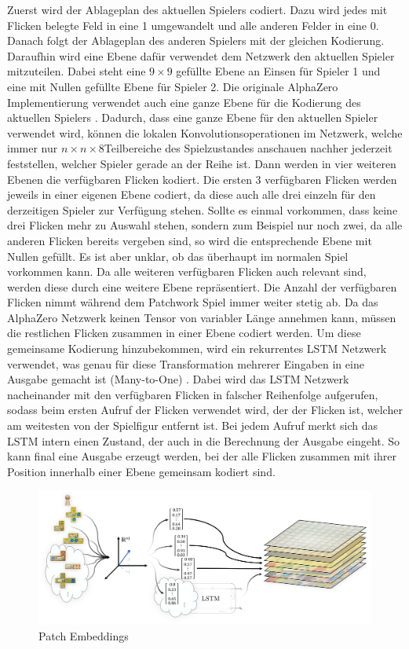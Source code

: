 Zuerst wird der Ablageplan des aktuellen Spielers codiert. Dazu wird jedes mit Flicken belegte Feld in eine 1 umgewandelt und alle anderen Felder in eine 0. Danach folgt der Ablageplan des anderen Spielers mit der gleichen Kodierung. Daraufhin wird eine Ebene dafür verwendet dem Netzwerk den aktuellen Spieler mitzuteilen. Dabei steht eine $9\times 9$ gefüllte Ebene an Einsen für Spieler 1 und eine mit Nullen gefüllte Ebene für Spieler 2. Die originale AlphaZero Implementierung verwendet auch eine ganze Ebene für die Kodierung des aktuellen Spielers \cite[Anhang]{2017.AlphaGoZeroPaper}. Dadurch, dass eine ganze Ebene für den aktuellen Spieler verwendet wird, können die lokalen Konvolutionsoperationen im Netzwerk, welche immer nur $n\times n\times 8$Teilbereiche des Spielzustandes anschauen nachher jederzeit feststellen, welcher Spieler gerade an der Reihe ist. Dann werden in vier weiteren Ebenen die verfügbaren Flicken kodiert. Die ersten 3 verfügbaren Flicken werden jeweils in einer eigenen Ebene codiert, da diese auch alle drei einzeln für den derzeitigen Spieler zur Verfügung stehen. Sollte es einmal vorkommen, dass keine drei Flicken mehr zu Auswahl stehen, sondern zum Beispiel nur noch zwei, da alle anderen Flicken bereits vergeben sind, so wird die entsprechende Ebene mit Nullen gefüllt. Es ist aber unklar, ob das überhaupt im normalen Spiel vorkommen kann. Da alle weiteren verfügbaren Flicken auch relevant sind, werden diese durch eine weitere Ebene repräsentiert. Die Anzahl der verfügbaren Flicken nimmt während dem Patchwork Spiel immer weiter stetig ab. Da das AlphaZero Netzwerk keinen Tensor von variabler Länge annehmen kann, müssen die restlichen Flicken zusammen in einer Ebene codiert werden. Um diese gemeinsame Kodierung hinzubekommen, wird ein rekurrentes \ac{LSTM} Netzwerk verwendet, was genau für diese Transformation mehrerer Eingaben in eine Ausgabe gemacht ist (Many-to-One) \cite{2015.RNN}. Dabei wird das \ac{LSTM} Netzwerk nacheinander mit den verfügbaren Flicken in falscher Reihenfolge aufgerufen, sodass beim ersten Aufruf der Flicken verwendet wird, der der Flicken ist, welcher am weitesten von der Spielfigur entfernt ist. Bei jedem Aufruf merkt sich das \ac{LSTM} intern einen Zustand, der auch in die Berechnung der Ausgabe eingeht. So kann final eine Ausgabe erzeugt werden, bei der alle Flicken zusammen mit ihrer Position innerhalb einer Ebene gemeinsam kodiert sind.

\begin{figure}[!ht]
    \centering
    \includegraphics[width=\textwidth]{res/pictures/patch-embeddings.png}
    \caption{Patch Embeddings}
    \label{fig:patch-embeddings}
\end{figure}

